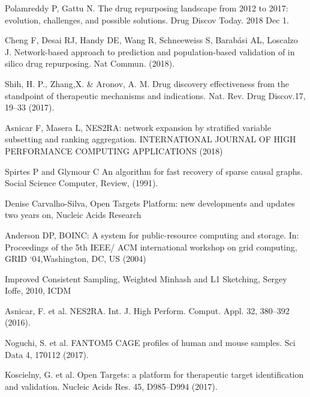\documentclass[fleqn,10pt]{SelfArx} %
\begin{document}

%
\begin{thebibliography}{1}
	
	 Polamreddy P, Gattu N. The drug repurposing landscape from 2012 to 2017: evolution, challenges, and possible solutions. Drug Discov Today. 2018 Dec 1.	
	
	 Cheng F, Desai RJ, Handy DE, Wang R, Schneeweiss S, Barabási AL, Loscalzo J. Network-based approach to prediction and population-based validation of in silico drug repurposing. Nat Commun. (2018).
	
	 Shih, H. P., Zhang,X. & Aronov, A. M. Drug discovery effectiveness from the standpoint of therapeutic mechanisms and indications. Nat. Rev. Drug Discov.17, 19–33 (2017).

	 Asnicar F, Masera L, NES2RA: network expansion by stratified variable subsetting and ranking aggregation. INTERNATIONAL JOURNAL OF HIGH PERFORMANCE COMPUTING APPLICATIONS (2018)
	
	Spirtes P and Glymour C An algorithm for fast recovery
of sparse causal graphs. Social Science Computer, Review, (1991).  

	Denise Carvalho-Silva, Open Targets Platform: new developments and updates two years on, Nucleic Acids Research 
	
	Anderson DP, BOINC: A system for public-resource computing and storage. In: Proceedings of the 5th IEEE/ ACM international workshop on grid computing, GRID ‘04,Washington, DC, US (2004)
	
	Improved Consistent Sampling, Weighted Minhash and L1 Sketching, Sergey Ioffe, 2010, ICDM
	
	 Asnicar, F. et al. NES2RA. Int. J. High Perform. Comput. Appl. 32, 380–392 (2016).
	
	
	 Noguchi, S. et al. FANTOM5 CAGE profiles of human and mouse samples. Sci Data 4, 170112 (2017).
	
	
	 Koscielny, G. et al. Open Targets: a platform for therapeutic target identification and validation. Nucleic Acids Res. 45, D985–D994 (2017).
	
	
\end{thebibliography}
\end{document}
